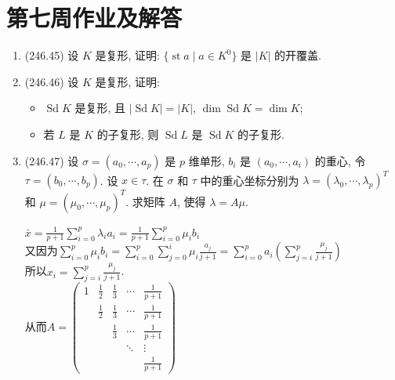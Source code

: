 \section{第七周作业及解答}
\begin{enumerate}
    \item(246.45) 设 $K$ 是复形, 证明: $\{\operatorname{st} a \mid a \in K^0\}$ 是 $|K|$ 的开覆盖.
    
    \item(246.46) 设 $K$ 是复形, 证明:
    \begin{itemize}
        \item[(1)] $\operatorname{Sd} K$ 是复形, 且 $|\operatorname{Sd} K| = |K|$, $\dim \operatorname{Sd} K = \dim K$;
        \item[(2)] 若 $L$ 是 $K$ 的子复形, 则 $\operatorname{Sd} L$ 是 $\operatorname{Sd} K$ 的子复形.
    \end{itemize}
    
    \item(246.47) 设 $\sigma = (a_0, \cdots, a_p)$ 是 $p$ 维单形, 
    $b_i$ 是 $(a_0, \cdots, a_i)$ 的重心, 令 $\tau = (b_0, \cdots, b_p)$. 
    设 $x \in \tau$. 在 $\sigma$ 和 $\tau$ 中的重心坐标分别为 
    $\lambda = (\lambda_0, \cdots, \lambda_p)^T$ 
    和 $\mu = (\mu_0, \cdots, \mu_p)^T$. 求矩阵 $A$, 使得 $\lambda = A\mu$.
    \begin{proofc}[解答]
        $\bar{x}=\frac{1}{p+1}\sum\limits^p_{i=0}\lambda_ia_i=\frac{1}{p+1}\sum\limits^p_{i=0}\mu_ib_i$\\
        又因为$\sum\limits^p_{i=0}\mu_ib_i=\sum\limits^p_{i=0}\sum\limits^i_{j=0}\mu_i\frac{a_j}{j+1}=\sum\limits^p_{i=0}a_i(\sum\limits^p_{j=i}\frac{\mu_j}{j+1})$\\
        所以$x_i=\sum\limits^p_{j=i}\frac{\mu_j}{j+1}$.\\
        从而$A=\begin{pmatrix}
            1 & \frac{1}{2} & \frac{1}{3} & \cdots & \frac{1}{p+1}\\
              & \frac{1}{2} & \frac{1}{3} & \cdots & \frac{1}{p+1}\\
              & & \frac{1}{3} & \cdots & \frac{1}{p+1}\\
              & & & \ddots &\vdots\\
              & & & & \frac{1}{p+1}
        \end{pmatrix}$


\end{proofc}
\end{enumerate}
